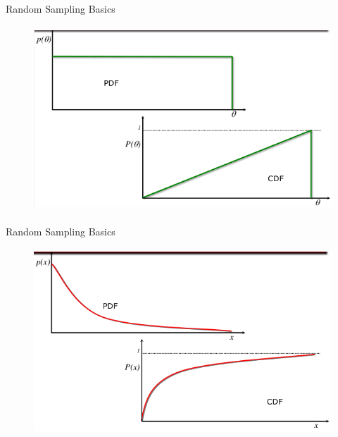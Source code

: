 \documentclass[xcolor=x11names,compress]{beamer}
\renewcommand{\(}{\begin{columns}}
\renewcommand{\)}{\end{columns}}
\newcommand{\<}[1]{\begin{column}{#1}}
\renewcommand{\>}{\end{column}}
\begin{document}
\begin{frame}{Random Sampling Basics}

  	\begin{figure}
  	\begin{center}
  		\includegraphics[height=2.75in,clip]{cont-pdf-cdf}
	\end{center}
  	\end{figure}

\end{frame}


\begin{frame}{Random Sampling Basics}

  	\begin{figure}
  	\begin{center}
  		\includegraphics[height=2.75in,clip]{cont-pdf-cdf-2}
	\end{center}
  	\end{figure}

\end{frame}
\end{document}
